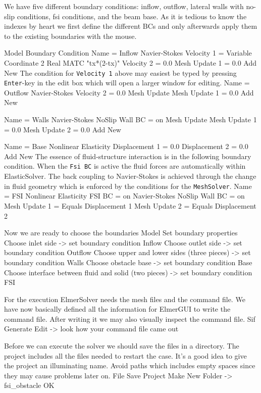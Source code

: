 We have five different boundary conditions: inflow, outflow, lateral walls with no-slip conditions, 
fsi conditions, and the beam base. 
As it is tedious to know the indexes by heart we 
first define the different BCs and only afterwards apply them to the existing boundaries 
with the mouse. 

\ttbegin
Model
  Boundary Condition
    Name = Inflow
    Navier-Stokes 
      Velocity 1 = Variable Coordinate 2 
        Real MATC "tx*(2-tx)"
      Velocity 2 = 0.0
      Mesh Update 1 = 0.0
    Add
    New
\ttend
The condition for \texttt{Velocity 1} above may easiest be typed by pressing \texttt{Enter}-key in the
edit box which will open a larger window for editing.
\ttbegin
    Name = Outflow
    Navier-Stokes 
      Velocity 2 = 0.0
    Mesh Update
      Mesh Update 1 = 0.0
    Add
    New

    Name = Walls
    Navier-Stokes 
      NoSlip Wall BC = on
    Mesh Update
      Mesh Update 1 = 0.0
      Mesh Update 2 = 0.0
    Add 
    New
 
    Name = Base
    Nonlinear Elasticity
      Displacement 1 = 0.0
      Displacement 2 = 0.0
    Add
    New
\ttend
The essence of fluid-structure interaction is in the following boundary condition. 
When the \texttt{Fsi BC} is active the fluid forces are automatically within ElasticSolver.
The back coupling to Navier-Stokes is achieved through the change in fluid geometry which is enforced
by the conditions for the \texttt{MeshSolver}.
\ttbegin
    Name = FSI 
    Nonlinear Elasticity 
      FSI BC = on
    Navier-Stokes 
      NoSlip Wall BC = on
    Mesh Update 1 = Equals Displacement 1
    Mesh Update 2 = Equals Displacement 2
\ttend   

Now we are ready to choose the boundaries 
\ttbegin
Model
  Set boundary properties
    Choose inlet side -> set boundary condition Inflow
    Choose outlet side -> set boundary condition Outflow
    Choose upper and lower sides (three pieces) -> set boundary condition Walls
    Choose obstacle base -> set boundary condition Base
    Choose interface between fluid and solid (two pieces) -> set boundary condition FSI
\ttend

For the execution 
ElmerSolver needs the mesh files and the command file. We have now basically defined
all the information for ElmerGUI to write the command file. After writing it we may also visually 
inspect the command file.
\ttbegin
Sif 
  Generate
  Edit -> look how your command file came out  
\ttend

Before we can execute the solver we should save the files in a directory. The project includes
all the files needed to restart the case. It's a good idea to give the project an illuminating name.
Avoid paths which includes empty spaces since they may cause problems later on. 
\ttbegin
File 
  Save Project
    Make New Folder -> fsi_obstacle
    OK
\ttend

